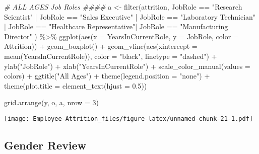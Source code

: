 \documentclass[
]{article}
\newenvironment{Shaded}{\begin{snugshade}}{\end{snugshade}}
\newcommand{\AttributeTok}[1]{\textcolor[rgb]{0.77,0.63,0.00}{#1}}
\newcommand{\CommentTok}[1]{\textcolor[rgb]{0.56,0.35,0.01}{\textit{#1}}}
\newcommand{\DecValTok}[1]{\textcolor[rgb]{0.00,0.00,0.81}{#1}}
\newcommand{\FloatTok}[1]{\textcolor[rgb]{0.00,0.00,0.81}{#1}}
\newcommand{\FunctionTok}[1]{\textcolor[rgb]{0.00,0.00,0.00}{#1}}
\newcommand{\NormalTok}[1]{#1}
\newcommand{\OtherTok}[1]{\textcolor[rgb]{0.56,0.35,0.01}{#1}}
\newcommand{\SpecialCharTok}[1]{\textcolor[rgb]{0.00,0.00,0.00}{#1}}
\newcommand{\StringTok}[1]{\textcolor[rgb]{0.31,0.60,0.02}{#1}}
\begin{document}
\begin{Shaded}
\begin{Highlighting}[]
\CommentTok{\# ALL AGES Job Roles \#\#\#\#}
\NormalTok{a }\OtherTok{\textless{}{-}} \FunctionTok{filter}\NormalTok{(attrition, JobRole }\SpecialCharTok{==} \StringTok{"Research Scientist"} \SpecialCharTok{|}\NormalTok{ JobRole }\SpecialCharTok{==} \StringTok{"Sales Executive"}  \SpecialCharTok{|}\NormalTok{ JobRole }\SpecialCharTok{==} \StringTok{"Laboratory Technician"} \SpecialCharTok{|}\NormalTok{ JobRole }\SpecialCharTok{==} \StringTok{"Healthcare Representative"}\SpecialCharTok{|}\NormalTok{ JobRole }\SpecialCharTok{==} \StringTok{"Manufacturing Director"}\NormalTok{ ) }\SpecialCharTok{\%\textgreater{}\%}
  \FunctionTok{ggplot}\NormalTok{(}\FunctionTok{aes}\NormalTok{(}\AttributeTok{x =}\NormalTok{ YearsInCurrentRole, }\AttributeTok{y =}\NormalTok{ JobRole, }\AttributeTok{color =}\NormalTok{ Attrition)) }\SpecialCharTok{+}
  \FunctionTok{geom\_boxplot}\NormalTok{() }\SpecialCharTok{+}
  \FunctionTok{geom\_vline}\NormalTok{(}\FunctionTok{aes}\NormalTok{(}\AttributeTok{xintercept =} \FunctionTok{mean}\NormalTok{(YearsInCurrentRole)), }\AttributeTok{color =} \StringTok{"black"}\NormalTok{, }\AttributeTok{linetype =} \StringTok{"dashed"}\NormalTok{) }\SpecialCharTok{+}
  \FunctionTok{ylab}\NormalTok{(}\StringTok{"JobRole"}\NormalTok{) }\SpecialCharTok{+}
  \FunctionTok{xlab}\NormalTok{(}\StringTok{"YearsInCurrentRole"}\NormalTok{) }\SpecialCharTok{+}
  \FunctionTok{scale\_color\_manual}\NormalTok{(}\AttributeTok{values =}\NormalTok{ colors) }\SpecialCharTok{+}
  \FunctionTok{ggtitle}\NormalTok{(}\StringTok{"All Ages"}\NormalTok{) }\SpecialCharTok{+}
  \FunctionTok{theme}\NormalTok{(}\AttributeTok{legend.position =} \StringTok{"none"}\NormalTok{) }\SpecialCharTok{+}
  \FunctionTok{theme}\NormalTok{(}\AttributeTok{plot.title =} \FunctionTok{element\_text}\NormalTok{(}\AttributeTok{hjust =} \FloatTok{0.5}\NormalTok{)) }

\FunctionTok{grid.arrange}\NormalTok{(y, o, a, }\AttributeTok{nrow =} \DecValTok{3}\NormalTok{)}
\end{Highlighting}
\end{Shaded}

\texttt{[image: Employee-Attrition\_files/figure-latex/unnamed-chunk-21-1.pdf]}

\hypertarget{gender-review}{%
\subsection{Gender Review}\label{gender-review}}
\end{document}
